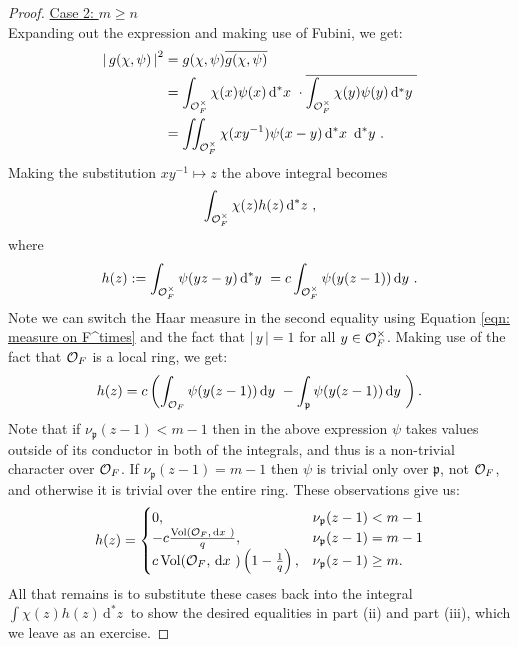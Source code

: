 \documentclass[11pt, x11names]{book}
\newcommand{\pp}{\mathfrak{p}}
\renewcommand{\bar}[1]{\overline{#1}}
\renewcommand{\brack}[1]{\left(   #1 \right)}
\newcommand{\abs}[1]{\left| \, #1  \,\right|}
\newcommand{\inv}[1]{#1^{-1}}
\newcommand{\dx}{\, \mathrm{d}x \ }
\newcommand{\dy}{\, \mathrm{d}y \ }
\renewcommand{\d}[1]{\, \mathrm{d}#1 \ }
\DeclareMathOperator{\vol}{Vol}
\begin{document}
\begin{proof}
\underline{Case 2: $m \geq n$}\\
Expanding out the expression and making use of Fubini, we get:
\begin{align*}
    \abs{g(\chi, \psi)}^2 &= g(\chi, \psi) \bar{g(\chi, \psi)}\\
    &= \int_{\calo_F^\times} \chi(x) \psi(x) \d{^*x} \cdot \bar{\int_{\calo_F^\times} \chi(y) \psi(y) \d{^*y}}\\
    &= \iint_{\calo_F^\times} \chi(x\inv{y})\psi(x-y)  \d{^*x} \d{^*y}.
\end{align*}
Making the substitution $x\inv{y} \mapsto z$ the above integral becomes
\begin{equation*}
    \int_{\calo_F^\times} \chi(z) h(z) \d{^*z},
\end{equation*}
where 
\begin{equation*}
    h(z) := \int_{\calo_F^\times} \psi(yz - y)\d{^*y} = c \int_{\calo_F^\times} \psi(y(z-1)) \dy.
\end{equation*}
Note we can switch the Haar measure in the second equality using Equation \ref{eqn: measure on F^times} and the fact that $\abs{y} = 1$ for all $y \in \mathcal{O}_F^\times$. Making use of the fact that $\mathcal{O}_F$ is a local ring, we get:
\begin{equation*}
    h(z) = c \brack{\int_{\calo_F} \psi(y(z - 1)) \dy - \int_\pp \psi(y(z - 1)) \dy}.
\end{equation*}
Note that if $\nu_\pp(z-1)  <  m-1$ then in the above expression $\psi$ takes values outside of its conductor in both of the integrals, and thus is a non-trivial character over $\mathcal{O}_F$. If $\nu_\pp(z-1) = m - 1$ then $\psi$ is trivial only over $\pp$, not $\mathcal{O}_F$, and otherwise it is trivial over the entire ring. These observations give us:
\begin{equation*}
    h(z) = \begin{cases}
        0, & \nu_\pp(z-1) < m-1\\
        -c\frac{\vol(\calo_F, \dx)}{q}, & \nu_\pp(z-1) = m-1\\
        c\vol(\calo_F, \dx)\brack{1 - \frac{1}{q}}, &   \nu_\pp(z-1) \geq m.
    \end{cases}
\end{equation*}
All that remains is to substitute these cases back into the integral $\int \chi(z)h(z) \d{^*z}$ to show the desired equalities in part (ii) and part (iii), which we leave as an exercise.
\end{proof}
\end{document}
